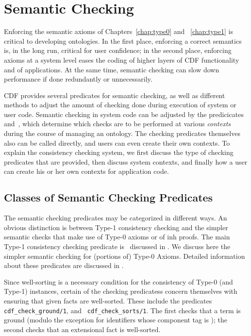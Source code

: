 \section{Semantic Checking} \label{sec:consist}

Enforcing the semantic axioms of Chapters~\ref{chap:type0} and
~\ref{chap:type1} is critical to developing ontologies.  In the first
place, enforcing a correct semantics is, in the long run, critical for
user confidence; in the second place, enforcing axioms at a system
level eases the coding of higher layers of CDF functionality and of
applications.  At the same time, semantic checking can slow down
performance if done redundantly or unnecessarily.

CDF provides several predicates for semantic checking, as well as
different methods to adjust the amount of checking done during
execution of system or user code.  Semantic checking in system code
can be adjusted by the predicicates~
and~, which determine which checks are to
be performed at various {\em contexts} during the course of managing
an ontology.  The checking predicates themselves also can be called
directly, and users can even create their own contexts.  To explain
the consistency checking system, we first discuss the type of checking
predicates that are provided, then discuss system contexts, and
finally how a user can create his or her own contexts for application
code.

\subsection{Classes of Semantic Checking Predicates} \label{sec:checkpreds}

The semantic checking predicates may be categorized in different ways.
An obvious distinction is between Type-1 consistency checking and the
simpler semantic checks that make use of Type-0 axioms or of {\sc inh}
proofs.  The main Type-1 consistency checking predicate
is~ discussed in .
We discuss here the simpler semantic checking for (portions of) Type-0
Axioms.  Detailed information about these predicates are discussed in
.

Since well-sorting is a necessary condition for the consistency of
Type-0 (and Type-1) instances, certain of the checking predicatess
concern themselves with ensuring that given facts are well-sorted.
These include the predicates {\tt cdf\_check\_ground/1}, and {\tt
cdf\_check\_sorts/1}.  The first checks that a term is ground (modulo
the exception for identifiers whose component tag is
); the second checks that an extensional fact is
well-sorted.

